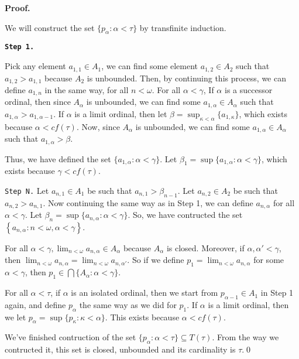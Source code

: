 \documentclass{article}
\begin{document}
			  \vskip 15pt
			  \textbf{Proof.} 

			  We will construct the set $\{p_\alpha: \alpha<\tau\}$ by transfinite induction.

			  \vskip 10pt
			  \texttt{\textbf{Step 1.}}

			  Pick any element $a_{1,1}\in A_1$, we can find some element $a_{1,2}\in A_2$ such that $a_{1,2}>a_{1,1}$ because $A_2$ is unbounded. Then, 
			  by continuing this process, we can define $a_{1,n}$ in the same way, for all $n<\omega$. 
			  For all $\alpha<\gamma$,
			  If $\alpha$ is a successor ordinal, then since $A_\alpha$ is unbounded, we can find some $a_{1,\alpha} \in A_\alpha$ such that $a_{1,\alpha}>a_{1,\alpha-1}$. If $\alpha$ is a limit ordinal, then let $\beta=\sup_{\kappa<\alpha} \{a_{1,\kappa}\}$, which exists because $\alpha<cf(\tau)$. Now, since $A_\alpha$ is unbounded, we can find some $a_{1,\alpha}\in A_\alpha$ such that $a_{1,\alpha} >  \beta$.

			  Thus, we have defined the set $\{a_{1,\alpha}: \alpha <\gamma\}$. Let $\beta_1=\sup\{a_{1,\alpha}: \alpha <\gamma\}$, which exists because $\gamma<cf(\tau)$. 

			  \vskip 10pt

			  \texttt{Step N.}
			  Let $a_{n,1}\in A_1$ be such that $a_{n,1} > \beta_{n-1}$. Let $a_{n,2}\in A_2$ be such that $a_{n,2} > a_{n,1}$. Now continuing the same way as in Step 1, we can define $a_{n,\alpha}$ for all $\alpha<\gamma$. Let $\beta_n=\sup\{a_{n,\alpha}: \alpha <\gamma\}$. 
			  \vskip 10pt
			  So, we have contructed the set $\left\{a_{n,\alpha}: n<\omega, \alpha<\gamma\right\}$.

			  \vskip 10pt

			  For all $\alpha<\gamma, \lim_{n<\omega} a_{n,\alpha} \in A_\alpha$ because $A_\alpha$ is closed. Moreover, if $\alpha,\alpha' <\gamma$, then $\lim_{n<\omega} a_{n,\alpha}= \lim_{n<\omega} a_{n,\alpha'}$. So if we define $p_1=\lim_{n<\omega} a_{n,\alpha}$ for some $\alpha<\gamma$, then $p_1\in \bigcap \{A_\alpha: \alpha<\gamma\}$. 
			  \vskip 10pt


			  For all $\alpha <\tau$, if $\alpha$ is an isolated ordinal, then we start from $p_{\alpha-1}\in A_1$ in Step 1 again, and define $p_\alpha$ the same way as we did for $p_1$. 
			  If $\alpha$ is a limit ordinal, then we let $p_\alpha= \sup \{p_\kappa: \kappa<\alpha\}$. This exists because $\alpha<cf(\tau)$. 

			  \vskip 10pt

			  We've finished contruction of the set $\{p_\alpha: \alpha<\tau\}\subseteq T(\tau)$.  From the way we contructed it, this set is closed, unbounded and its cardinality is $\tau$.\qed
\end{document}
